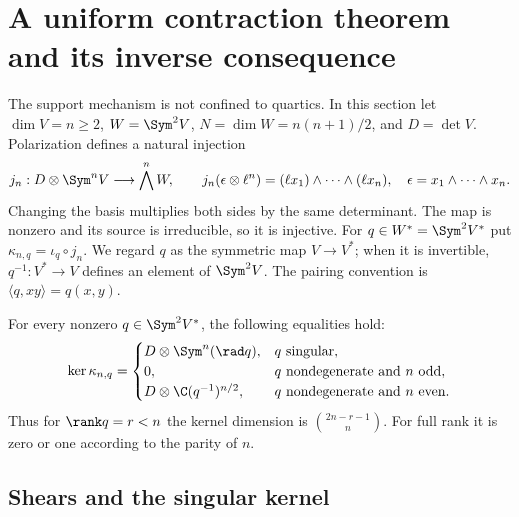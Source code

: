 \section{A uniform contraction theorem and its inverse consequence}
\label{sec:uniform-support}

The support mechanism is not confined to quartics.  In this section let
\(\dim V=n\ge2\), \(W=\Sym^2V\), \(N=\dim W=n(n+1)/2\), and
\(D=\det V\).  Polarization defines a natural injection
\begin{equation}\label{eq:uniform-j}
 j_n:D\otimes\Sym^nV\longrightarrow\bigwedge^nW,\qquad
 j_n(\epsilon\otimes\ell^n)=
       (\ell x_1)\wedge\cdots\wedge(\ell x_n),
 \quad \epsilon=x_1\wedge\cdots\wedge x_n.
\end{equation}
Changing the basis multiplies both sides by the same determinant.
The map is nonzero and its source is irreducible, so it is injective.
For \(q\in W^*=\Sym^2V^*\) put \(\kappa_{n,q}=\iota_q\circ j_n\).
We regard \(q\) as the symmetric map \(V\to V^*\); when it is
invertible, \(q^{-1}:V^*\to V\) defines an element of \(\Sym^2V\).
The pairing convention is \(\langle q,xy\rangle=q(x,y)\).

\begin{theorem}
\label{thm:uniform-contraction}
For every nonzero \(q\in\Sym^2V^*\), the following equalities hold:
\begin{equation}\label{eq:uniform-kernels}
 \ker\kappa_{n,q}=
 \begin{cases}
 D\otimes\Sym^n(\rad q),&q\text{ singular},\\
 0,&q\text{ nondegenerate and }n\text{ odd},\\
 D\otimes\C(q^{-1})^{n/2},&q\text{ nondegenerate and }n\text{ even}.
 \end{cases}
\end{equation}
Thus for \(\rank q=r<n\) the kernel dimension is
\(\binom{2n-r-1}{n}\).  For full rank it is zero or one according
to the parity of \(n\).
\end{theorem}

\subsection{Shears and the singular kernel}




